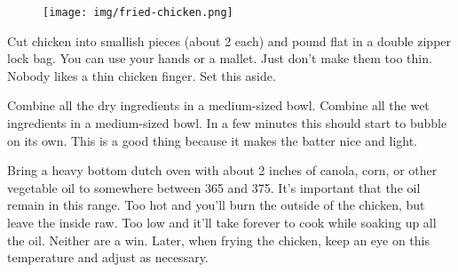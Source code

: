 \begin{figure}[!hp]
    \centering
    \captionsetup{labelformat=empty}
    \texttt{[image: img/fried-chicken.png]}
\end{figure}

\begin{IngredientsAndSteps}
    {}

    {}

    \ListIngredientsAndSteps[Then...]
    {
    }
    {
        Cut chicken into smallish pieces (about 2 \Ounce[s] each) and pound flat in a double zipper lock bag. You can
        use your hands or a mallet. Just don't make them too thin. Nobody likes a thin chicken finger. Set this aside.

        Combine all the dry ingredients in a medium-sized bowl. Combine all the wet ingredients in a medium-sized bowl. In a few
        minutes this should start to bubble on its own. This
        is a good thing because it makes the batter nice and light.

        Bring a heavy bottom dutch oven with about 2 inches of canola, corn, or other vegetable oil to somewhere between
        365 and 375\Degrees[F]. It's important that the oil remain in this range. Too hot and you'll burn the outside of the
        chicken, but leave the inside raw. Too low and it'll take forever to cook while soaking up all the oil. Neither
        are a win. Later, when frying the chicken, keep an eye on this temperature and adjust as necessary.

}
\end{IngredientsAndSteps}
